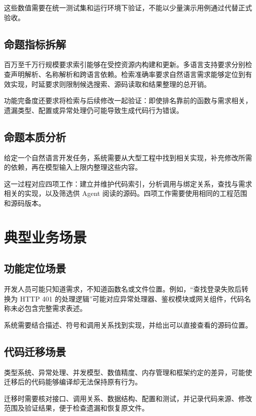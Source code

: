 这些数值需要在统一测试集和运行环境下验证，不能以少量演示用例通过代替正式验收。

\subsection{命题指标拆解}

百万至千万行规模要求索引能够在受控资源内构建和更新。多语言支持要求分别检查声明解析、名称解析和跨语言依赖。检索准确率要求自然语言需求能够定位到有效实现，时延要求则限制候选搜索、源码读取和结果整理的总开销。

功能完备度还要求将检索与后续修改一起验证：即使排名靠前的函数与需求相关，遗漏类型、配置或异常处理仍可能导致生成代码行为错误。

\subsection{命题本质分析}

给定一个自然语言开发任务，系统需要从大型工程中找到相关实现，补充修改所需的依赖，再在模型输入上限内整理这些内容。

这一过程对应四项工作：建立并维护代码索引，分析调用与绑定关系，查找与需求相关的实现，以及筛选供 Agent 阅读的源码。四项工作需要使用相同的工程范围和源码版本。

\section{典型业务场景}

\subsection{功能定位场景}

开发人员可能只知道需求，不知道函数名或文件位置。例如，“查找登录失败后转换为 HTTP 401 的处理逻辑”可能对应异常处理器、鉴权模块或网关组件，代码名称未必包含完整需求表述。

系统需要结合描述、符号和调用关系找到实现，并给出可以直接查看的源码位置。

\subsection{代码迁移场景}

类型系统、异常处理、并发模型、数值精度、内存管理和框架约定的差异，可能使迁移后的代码能够编译却无法保持原有行为。

迁移时需要核对接口、调用关系、数据结构、配置和测试，并记录代码来源、修改范围及验证结果，便于检查遗漏和恢复原文件。

